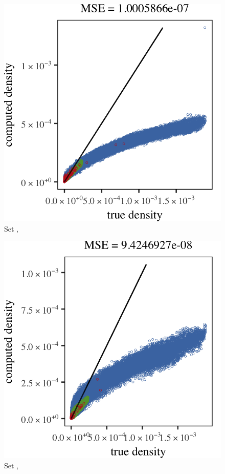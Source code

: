 \begin{subfigure}{0.23\textwidth}
	\centering
	\includegraphics[keepaspectratio=true, width=\textwidth, height=0.23\textheight]{result/img/all/results_ferdosi_2_60000_sambe_silverman}
	\caption{Set \ferdosiTwo, \sambe}
	\label{fig:results:multisphere:sambe:ferdosi2}
\end{subfigure}
\begin{subfigure}{0.23\textwidth}
	\centering
	\includegraphics[keepaspectratio=true, width=\textwidth, height=0.23\textheight]{result/img/all/results_baakman_2_60000_sambe_silverman}
	\caption{Set \baakmanTwo, \sambe}
	\label{fig:results:multisphere:sambe:baakman2}
\end{subfigure}
